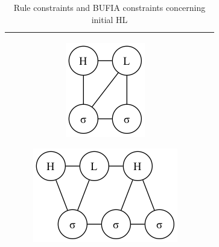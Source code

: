 \documentclass[11pt,letterpaper]{article}
\begin{document}
\begin{table}[ht]
\begin{tabular}{c|c}
\begin{subfigure}{0.137\textwidth}
			\includegraphics[width=\textwidth]{hausacons/cons2}
			\caption{}
			\label{cons3b}
		\end{subfigure}
		\begin{subfigure}{0.25\textwidth}
			\includegraphics[width=\textwidth]{hausacons/6HLHt3s3}
			\caption{}
			\label{cons3c}
		\end{subfigure}\\
		\hline
	\end{tabular}
	\caption{Rule constraints and BUFIA constraints concerning initial HL}
	\label{tab:disyl}
\end{table}
\end{document}
